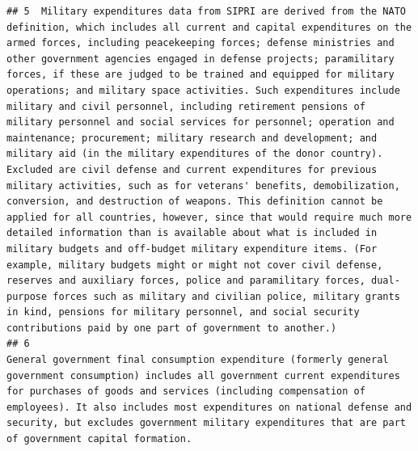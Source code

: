 \documentclass[
]{article}
\begin{document}
\begin{verbatim}
## 5  Military expenditures data from SIPRI are derived from the NATO definition, which includes all current and capital expenditures on the armed forces, including peacekeeping forces; defense ministries and other government agencies engaged in defense projects; paramilitary forces, if these are judged to be trained and equipped for military operations; and military space activities. Such expenditures include military and civil personnel, including retirement pensions of military personnel and social services for personnel; operation and maintenance; procurement; military research and development; and military aid (in the military expenditures of the donor country). Excluded are civil defense and current expenditures for previous military activities, such as for veterans' benefits, demobilization, conversion, and destruction of weapons. This definition cannot be applied for all countries, however, since that would require much more detailed information than is available about what is included in military budgets and off-budget military expenditure items. (For example, military budgets might or might not cover civil defense, reserves and auxiliary forces, police and paramilitary forces, dual-purpose forces such as military and civilian police, military grants in kind, pensions for military personnel, and social security contributions paid by one part of government to another.)
## 6                                                                                                                                                                                                                                                                                                                                                                                                                                                                                                                                                                                                                                                                                                                                                                                                                                                                                                                                                                                                                                                               General government final consumption expenditure (formerly general government consumption) includes all government current expenditures for purchases of goods and services (including compensation of employees). It also includes most expenditures on national defense and security, but excludes government military expenditures that are part of government capital formation.

\end{verbatim}
\end{document}
